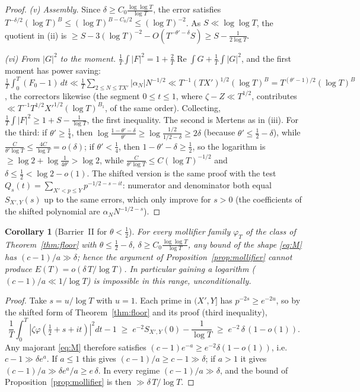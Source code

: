 \documentclass[11pt]{amsart}
\theoremstyle{plain}
\newtheorem{corollary}[theorem]{Corollary}
\theoremstyle{definition}
\theoremstyle{remark}
\renewcommand{\Re}{\operatorname{Re}}
\begin{document}
\begin{proof}
\emph{(v) Assembly.} Since $\delta\ge C_0\frac{\log\log T}{\log T}$, the error satisfies $T^{-\delta/2}(\log T)^{B}\le(\log T)^{B-C_0/2}\le(\log T)^{-2}$. As $S\ll\log\log T$, the quotient in (ii) is $\ge S-3(\log T)^{-2}-O(T^{-\theta'-\delta}S)\ge S-\frac1{2\log T}$.

\emph{(vi) From $|G|^2$ to the moment.} $\frac1T\int|F|^2=1+\frac2T\Re\int G+\frac1T\int|G|^2$, and the first moment has power saving: $\frac1T\int_0^T(F_0-1)\,dt\ll\frac1T\sum_{2\le N\le TX'}|\alpha_N|N^{-1/2}\ll T^{-1}(TX')^{1/2}(\log T)^{B}=T^{(\theta'-1)/2}(\log T)^{B}$, the correctors likewise (the segment $0\le t\le1$, where $\zeta-Z\ll T^{1/2}$, contributes $\ll T^{-1}T^{1/2}X'^{1/2}(\log T)^{B_1}$, of the same order). Collecting, $\frac1T\int|F|^2\ge1+S-\frac1{\log T}$, the first inequality. The second is Mertens as in (iii). For the third: if $\theta'\ge\tfrac14$, then $\log\frac{1-\theta'-\delta}{\theta'}\ge\log\frac{1/2}{1/2-\delta}\ge2\delta$ (because $\theta'\le\tfrac12-\delta$), while $\frac{C}{\theta'\log T}\le\frac{4C}{\log T}=o(\delta)$; if $\theta'<\tfrac14$, then $1-\theta'-\delta\ge\tfrac12$, so the logarithm is $\ge\log2+\log\frac{1}{4\theta'}>\log 2$, while $\frac{C}{\theta'\log T}\le C(\log T)^{-1/2}$ and $\delta\le\tfrac12<\log 2-o(1)$. The shifted version is the same proof with the test $Q_s(t)=\sum_{X'<p\le Y}p^{-1/2-s-it}$: numerator and denominator both equal $S_{X',Y}(s)$ up to the same errors, which only improve for $s>0$ (the coefficients of the shifted polynomial are $\alpha_NN^{-1/2-s}$).
\end{proof}

\begin{corollary}[Barrier~II for $\theta<\tfrac12$]\label{cor:floorbarrier}
For every mollifier family $\varphi_T$ of the class of Theorem~\ref{thm:floor} with $\theta\le\tfrac12-\delta$, $\delta\ge C_0\frac{\log\log T}{\log T}$, any bound of the shape \eqref{eq:M} has $(c-1)/a\gg\delta$; hence the argument of Proposition~\ref{prop:mollifier} cannot produce $E(T)=o(\delta\,T/\log T)$. In particular gaining a logarithm \textup{(}$(c-1)/a\ll1/\log T$\textup{)} is impossible in this range, unconditionally.
\end{corollary}

\begin{proof}
Take $s=u/\log T$ with $u=1$. Each prime in $(X',Y]$ has $p^{-2s}\ge e^{-2u}$, so by the shifted form of Theorem~\ref{thm:floor} and its proof (third inequality),
\[
\frac1T\int_0^T|\zeta\varphi(\tfrac12+s+it)|^2dt-1\;\ge\;e^{-2}S_{X',Y}(0)-\frac1{\log T}\;\ge\;e^{-2}\,\delta\,(1-o(1)).
\]
Any majorant \eqref{eq:M} therefore satisfies $(c-1)e^{-a}\ge e^{-2}\delta(1-o(1))$, i.e.\ $c-1\gg\delta e^{a}$. If $a\le1$ this gives $(c-1)/a\ge c-1\gg\delta$; if $a>1$ it gives $(c-1)/a\gg\delta e^{a}/a\ge e\,\delta$. In every regime $(c-1)/a\gg\delta$, and the bound of Proposition~\ref{prop:mollifier} is then $\gg\delta\,T/\log T$.
\end{proof}
\end{document}
